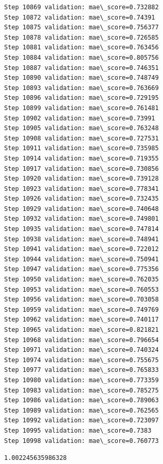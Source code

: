 \documentclass[11pt]{article}
\makeatletter
\newcommand{\boxspacing}{\kern\kvtcb@left@rule\kern\kvtcb@boxsep}
\newcommand{\prompt}[4]{
        {\ttfamily\llap{{\color{#2}[#3]:\hspace{3pt}#4}}\vspace{-\baselineskip}}
    }
\makeatother
\begin{document}
\begin{Verbatim}[commandchars=\\\{\}]
Step 10869 validation: mae\_score=0.732882
Step 10872 validation: mae\_score=0.74391
Step 10875 validation: mae\_score=0.756377
Step 10878 validation: mae\_score=0.726585
Step 10881 validation: mae\_score=0.763456
Step 10884 validation: mae\_score=0.805756
Step 10887 validation: mae\_score=0.746351
Step 10890 validation: mae\_score=0.748749
Step 10893 validation: mae\_score=0.763669
Step 10896 validation: mae\_score=0.729195
Step 10899 validation: mae\_score=0.761481
Step 10902 validation: mae\_score=0.73991
Step 10905 validation: mae\_score=0.763248
Step 10908 validation: mae\_score=0.727531
Step 10911 validation: mae\_score=0.735985
Step 10914 validation: mae\_score=0.719355
Step 10917 validation: mae\_score=0.730856
Step 10920 validation: mae\_score=0.739128
Step 10923 validation: mae\_score=0.778341
Step 10926 validation: mae\_score=0.732435
Step 10929 validation: mae\_score=0.740648
Step 10932 validation: mae\_score=0.749801
Step 10935 validation: mae\_score=0.747814
Step 10938 validation: mae\_score=0.748941
Step 10941 validation: mae\_score=0.722012
Step 10944 validation: mae\_score=0.750941
Step 10947 validation: mae\_score=0.775356
Step 10950 validation: mae\_score=0.762035
Step 10953 validation: mae\_score=0.760553
Step 10956 validation: mae\_score=0.703058
Step 10959 validation: mae\_score=0.749769
Step 10962 validation: mae\_score=0.740117
Step 10965 validation: mae\_score=0.821821
Step 10968 validation: mae\_score=0.796654
Step 10971 validation: mae\_score=0.740324
Step 10974 validation: mae\_score=0.755675
Step 10977 validation: mae\_score=0.765833
Step 10980 validation: mae\_score=0.773359
Step 10983 validation: mae\_score=0.785275
Step 10986 validation: mae\_score=0.789063
Step 10989 validation: mae\_score=0.762565
Step 10992 validation: mae\_score=0.723097
Step 10995 validation: mae\_score=0.7383
Step 10998 validation: mae\_score=0.760773
    \end{Verbatim}

            \begin{tcolorbox}[breakable, size=fbox, boxrule=.5pt, pad at break*=1mm, opacityfill=0]
\prompt{Out}{outcolor}{3}{\boxspacing}
\begin{Verbatim}[commandchars=\\\{\}]
1.002245635986328
\end{Verbatim}
\end{tcolorbox}
        
\end{document}
